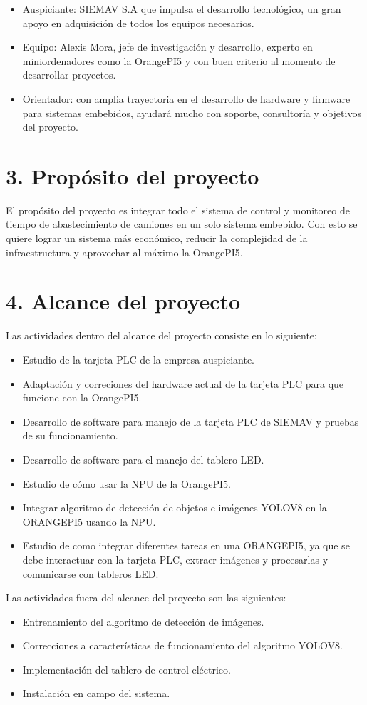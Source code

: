 \documentclass[
11pt, %
]{charter}
\begin{document}
\begin{itemize}
	\item Auspiciante: SIEMAV S.A que impulsa el desarrollo tecnológico, un gran apoyo en adquisición de todos los equipos necesarios.
	\item Equipo: Alexis Mora, jefe de investigación y desarrollo, experto en miniordenadores como la OrangePI5 y con buen criterio al momento de desarrollar proyectos.
	\item Orientador: con amplia trayectoria en el desarrollo de hardware y firmware para sistemas embebidos, ayudará mucho con soporte, consultoría y objetivos del proyecto.
\end{itemize}


\section{3. Propósito del proyecto}
\label{sec:proposito}
El propósito del proyecto es integrar todo el sistema de control y monitoreo de tiempo de abastecimiento de camiones en un solo sistema embebido. Con esto se quiere lograr un sistema más económico, reducir la complejidad de la infraestructura y aprovechar al máximo la OrangePI5.

\section{4. Alcance del proyecto}
\label{sec:alcance}
Las actividades dentro del alcance del proyecto consiste en lo siguiente:
\begin{itemize}
	\item Estudio de la tarjeta PLC de la empresa auspiciante.
	\item Adaptación y correciones del hardware actual de la tarjeta PLC para que funcione con la OrangePI5. 
	\item Desarrollo de software para manejo de la tarjeta PLC de SIEMAV y pruebas de su funcionamiento.
	\item Desarrollo de software para el manejo del tablero LED.
	\item Estudio de cómo usar la NPU de la OrangePI5.
	\item Integrar algoritmo de detección de objetos e imágenes YOLOV8 en la ORANGEPI5 usando la NPU.
	\item Estudio de como integrar diferentes tareas en una ORANGEPI5, ya que se debe interactuar con la tarjeta PLC, extraer imágenes y procesarlas y comunicarse con tableros LED.
\end{itemize}
Las actividades fuera del alcance del proyecto son las siguientes:
\begin{itemize}
	\item Entrenamiento del algoritmo de detección de imágenes.
	\item Correcciones a características de funcionamiento del algoritmo YOLOV8.
	\item Implementación del tablero de control eléctrico.
	\item Instalación en campo del sistema.
\end{itemize}
\end{document}
